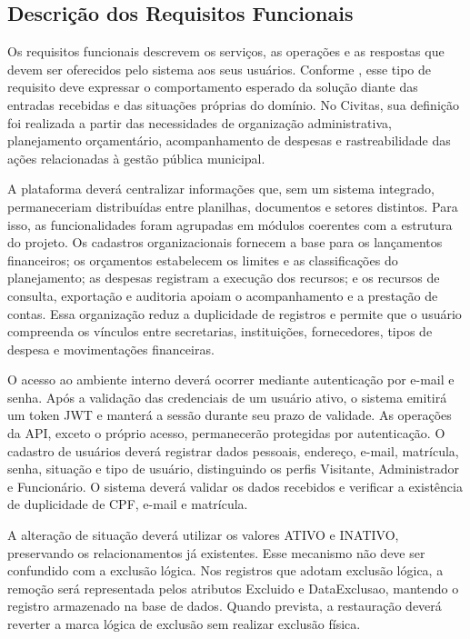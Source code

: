 \subsection{Descrição dos Requisitos Funcionais}

Os requisitos funcionais descrevem os serviços, as operações e as respostas que devem ser oferecidos pelo sistema aos seus usuários. Conforme \textcite{Sommerville2018ES10}, esse tipo de requisito deve expressar o comportamento esperado da solução diante das entradas recebidas e das situações próprias do domínio. No Civitas, sua definição foi realizada a partir das necessidades de organização administrativa, planejamento orçamentário, acompanhamento de despesas e rastreabilidade das ações relacionadas à gestão pública municipal.

A plataforma deverá centralizar informações que, sem um sistema integrado, permaneceriam distribuídas entre planilhas, documentos e setores distintos. Para isso, as funcionalidades foram agrupadas em módulos coerentes com a estrutura do projeto. Os cadastros organizacionais fornecem a base para os lançamentos financeiros; os orçamentos estabelecem os limites e as classificações do planejamento; as despesas registram a execução dos recursos; e os recursos de consulta, exportação e auditoria apoiam o acompanhamento e a prestação de contas. Essa organização reduz a duplicidade de registros e permite que o usuário compreenda os vínculos entre secretarias, instituições, fornecedores, tipos de despesa e movimentações financeiras.

O acesso ao ambiente interno deverá ocorrer mediante autenticação por e-mail e senha. Após a validação das credenciais de um usuário ativo, o sistema emitirá um token JWT e manterá a sessão durante seu prazo de validade. As operações da API, exceto o próprio acesso, permanecerão protegidas por autenticação. O cadastro de usuários deverá registrar dados pessoais, endereço, e-mail, matrícula, senha, situação e tipo de usuário, distinguindo os perfis Visitante, Administrador e Funcionário. O sistema deverá validar os dados recebidos e verificar a existência de duplicidade de CPF, e-mail e matrícula.

A alteração de situação deverá utilizar os valores ATIVO e INATIVO, preservando os relacionamentos já existentes. Esse mecanismo não deve ser confundido com a exclusão lógica. Nos registros que adotam exclusão lógica, a remoção será representada pelos atributos Excluido e DataExclusao, mantendo o registro armazenado na base de dados. Quando prevista, a restauração deverá reverter a marca lógica de exclusão sem realizar exclusão física.

